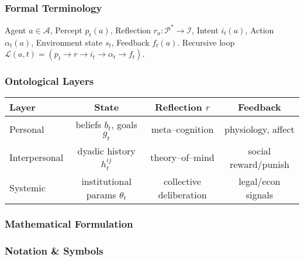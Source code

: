 \subsubsection{Formal Terminology}
Agent $a\in\mathcal{A}$, Percept $p_t(a)$, Reflection $r_a:\mathcal{P}^\ast\to\mathcal{I}$, Intent $i_t(a)$, Action $\alpha_t(a)$, Environment state $s_t$, Feedback $f_t(a)$.
Recursive loop $\mathcal{L}(a,t)=(p_t\rightarrow r\rightarrow i_t\rightarrow\alpha_t\rightarrow f_t)$.

\subsubsection{Ontological Layers}
\label{sec:ontological}

\begin{center}
\begin{tabular}{lccc}
\hline
Layer & State & Reflection $r$ & Feedback \\\hline
Personal & beliefs $b_t$, goals $g_t$ & meta--cognition & physiology, affect\\
Interpersonal & dyadic history $h^{ij}_t$ & theory--of--mind & social reward/punish\\
Systemic & institutional params $\theta_t$ & collective deliberation & legal/econ signals\\\hline
\end{tabular}
\end{center}

\subsubsection{Mathematical Formulation}

\subsubsection{Notation \& Symbols}
\label{sec:notation}

